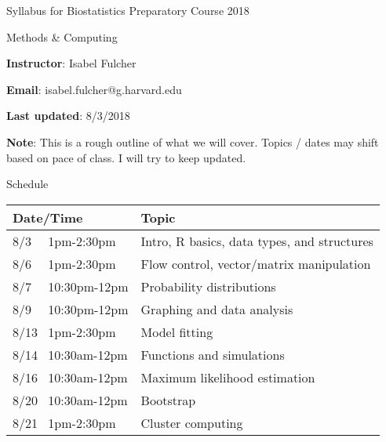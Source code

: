 \documentclass[12pt]{article}
\begin{document}
\begin{center}Syllabus for Biostatistics Preparatory Course 2018 \end{center}
\begin{center} Methods \& Computing \end{center}



{\bf{Instructor}}: Isabel Fulcher

{\bf{Email}}: isabel.fulcher@g.harvard.edu

{\bf{Last updated}}: 8/3/2018

{\bf{Note}}: This is a rough outline of what we will cover. Topics / dates may shift  based on pace of class. I will try to keep updated. 

\begin{center} Schedule \end{center}
\begin{table}[htpb!]
\centering
\label{my-label}
\begin{tabular}{|l|l|}
\hline
{\bf{Date/Time}} & {\bf{Topic}} \\ \hline
8/3 ~~1pm-2:30pm &  Intro, R basics, data types, and structures\\ \hline
8/6 ~~1pm-2:30pm & Flow control, vector/matrix manipulation  \\ \hline
8/7 ~~10:30pm-12pm &  Probability distributions  \\ \hline
8/9 ~~10:30pm-12pm &  Graphing and data analysis \\ \hline
8/13 ~1pm-2:30pm &  Model fitting \\ \hline
8/14 ~10:30am-12pm &  Functions and simulations \\ \hline
8/16 ~10:30am-12pm & Maximum likelihood estimation \\ \hline
8/20 ~10:30am-12pm &  Bootstrap \\ \hline
8/21 ~1pm-2:30pm & Cluster computing \\ \hline
\end{tabular}
\end{table}
\end{document}
